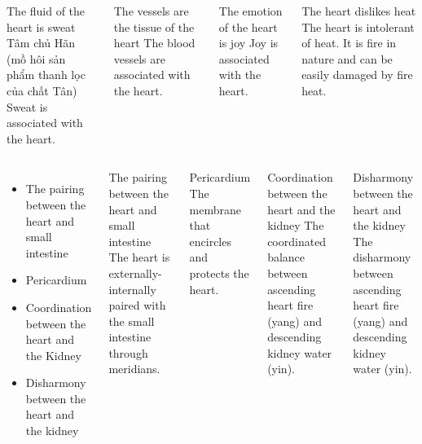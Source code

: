 \documentclass[
	11pt, %
]{beamer}
\theoremstyle{newblock}
\begin{document}
\begin{frame}
\begin{columns}[T]
{\begin{block}{The fluid of the heart is sweat}
				Tâm chủ Hãn (mồ hôi sản phẩm thanh lọc của chất Tân)\\
				Sweat is associated with the heart.
			\end{block}
			\begin{block}{The vessels are the tissue of	the heart}
				The blood vessels are associated with the heart. 
			\end{block}
			\begin{block}{The emotion of the heart is joy}
				Joy is associated with the heart.
			\end{block}
			\begin{block}{The heart dislikes heat}
				The heart is intolerant of heat. It is fire in nature and can be easily damaged by fire heat.
			\end{block}
		}
	\end{columns}
\end{frame}
\begin{frame}
	\begin{columns}[T]
\begin{itemize}
	\item The pairing between the heart and small intestine
	\item Pericardium
	\item Coordination between the heart and the Kidney
	\item Disharmony between the heart and the kidney
\end{itemize}
		\begin{block}{The pairing between the heart and small 
			intestine}	
			The heart is externally-internally paired with the 
small intestine through meridians. 
		\end{block}
		\begin{block}{Pericardium}
			The membrane that encircles and protects the 
heart.
		\end{block}
		\begin{block}{Coordination between the heart and the 
			kidney}
			The coordinated balance between ascending heart 
fire (yang) and descending kidney water (yin).
		\end{block}
		\begin{block}{Disharmony between the heart and the kidney}
			The disharmony between ascending heart fire (yang) and descending kidney water (yin).
		\end{block}
	\end{columns}
\end{frame}
\end{document}
